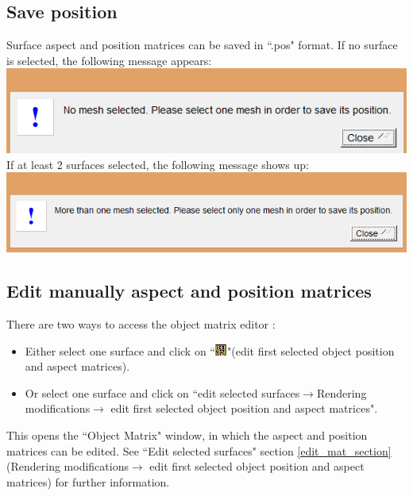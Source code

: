 \subsection{Save position}
Surface aspect and position matrices can be saved in ``.pos" format. If no surface is selected, the
following message appears:\\
\includegraphics[scale=0.5]{images/File/save_pos1.png}
\\
If at least 2 surfaces selected, the following message shows up:\\
\includegraphics[scale=0.5]{images/File/save_pos2png.png}

\subsection{Edit manually aspect and position matrices}
There are two ways to access the object matrix editor :
\begin{itemize}

\item Either select one surface and click on ``\includegraphics[scale=0.7]{images/pixmap/mat.png}"(edit first selected object position and aspect matrices).
\item Or select one surface and click on ``edit selected surfaces$\rightarrow$Rendering modifications$\rightarrow$ edit first
selected object position and aspect matrices".
\end{itemize}



This opens the ``Object Matrix" window, in which the aspect and position matrices can be edited. See ``Edit selected surfaces" section \ref{edit_mat_section} (Rendering modifications$\rightarrow$ edit first selected object position and aspect matrices) for further information.




